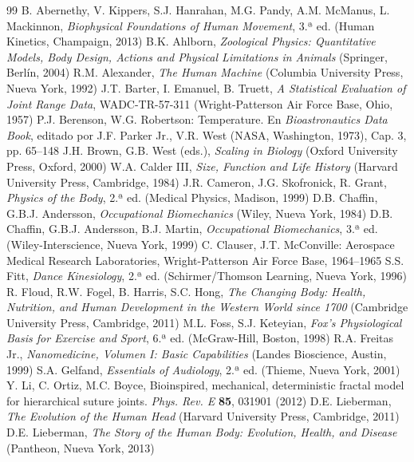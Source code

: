 \documentclass[12pt]{book}
\begin{document}
\begin{thebibliography}{99}
 B. Abernethy, V. Kippers, S.J. Hanrahan, M.G. Pandy, A.M. McManus, L. Mackinnon, \textit{Biophysical Foundations of Human Movement}, 3.ª ed. (Human Kinetics, Champaign, 2013)
 B.K. Ahlborn, \textit{Zoological Physics: Quantitative Models, Body Design, Actions and Physical Limitations in Animals} (Springer, Berlín, 2004)
 R.M. Alexander, \textit{The Human Machine} (Columbia University Press, Nueva York, 1992)
 J.T. Barter, I. Emanuel, B. Truett, \textit{A Statistical Evaluation of Joint Range Data}, WADC-TR-57-311 (Wright-Patterson Air Force Base, Ohio, 1957)
 P.J. Berenson, W.G. Robertson: Temperature. En \textit{Bioastronautics Data Book}, editado por J.F. Parker Jr., V.R. West (NASA, Washington, 1973), Cap. 3, pp. 65--148
 J.H. Brown, G.B. West (eds.), \textit{Scaling in Biology} (Oxford University Press, Oxford, 2000)
 W.A. Calder III, \textit{Size, Function and Life History} (Harvard University Press, Cambridge, 1984)
 J.R. Cameron, J.G. Skofronick, R. Grant, \textit{Physics of the Body}, 2.ª ed. (Medical Physics, Madison, 1999)
 D.B. Chaffin, G.B.J. Andersson, \textit{Occupational Biomechanics} (Wiley, Nueva York, 1984)
 D.B. Chaffin, G.B.J. Andersson, B.J. Martin, \textit{Occupational Biomechanics}, 3.ª ed. (Wiley-Interscience, Nueva York, 1999)
 C. Clauser, J.T. McConville: Aerospace Medical Research Laboratories, Wright-Patterson Air Force Base, 1964--1965
 S.S. Fitt, \textit{Dance Kinesiology}, 2.ª ed. (Schirmer/Thomson Learning, Nueva York, 1996)
 R. Floud, R.W. Fogel, B. Harris, S.C. Hong, \textit{The Changing Body: Health, Nutrition, and Human Development in the Western World since 1700} (Cambridge University Press, Cambridge, 2011)
 M.L. Foss, S.J. Keteyian, \textit{Fox's Physiological Basis for Exercise and Sport}, 6.ª ed. (McGraw-Hill, Boston, 1998)
 R.A. Freitas Jr., \textit{Nanomedicine, Volumen I: Basic Capabilities} (Landes Bioscience, Austin, 1999)
 S.A. Gelfand, \textit{Essentials of Audiology}, 2.ª ed. (Thieme, Nueva York, 2001)
 Y. Li, C. Ortiz, M.C. Boyce, Bioinspired, mechanical, deterministic fractal model for hierarchical suture joints. \textit{Phys. Rev. E} \textbf{85}, 031901 (2012)
 D.E. Lieberman, \textit{The Evolution of the Human Head} (Harvard University Press, Cambridge, 2011)
 D.E. Lieberman, \textit{The Story of the Human Body: Evolution, Health, and Disease} (Pantheon, Nueva York, 2013)

\end{thebibliography}
\end{document}
